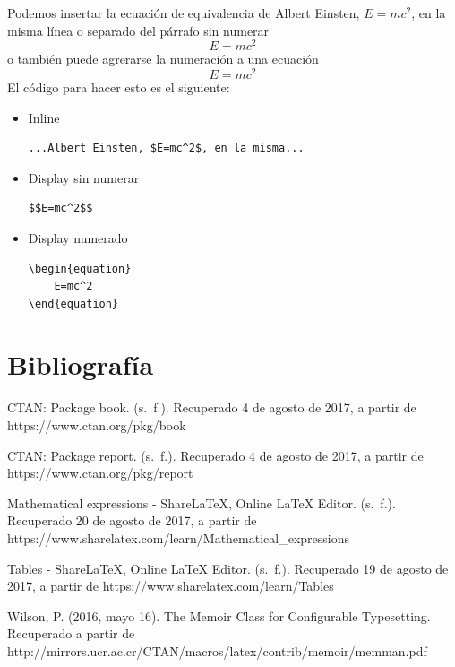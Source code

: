 \documentclass[10pt,journal,compsoc]{IEEEtran}
\begin{document}
Podemos insertar la ecuaci\'on de equivalencia de Albert Einsten, $E=mc^2$, en la misma l\'inea o separado del p\'arrafo sin numerar
$$E=mc^2$$
o tambi\'en puede agrerarse la numeraci\'on a una ecuaci\'on
\begin{equation}
	E=mc^2
\end{equation}
El c\'odigo para hacer esto es el siguiente:
\begin{itemize}
	\item Inline
\begin{lstlisting}
...Albert Einsten, $E=mc^2$, en la misma...
\end{lstlisting}
	\item Display sin numerar
\begin{lstlisting}
$$E=mc^2$$
\end{lstlisting}
	\item Display numerado
\begin{lstlisting}
\begin{equation}
	E=mc^2
\end{equation}
\end{lstlisting}
\end{itemize}

\section{Bibliograf\'ia}
CTAN: Package book. (s. f.). Recuperado 4 de agosto de 2017, a partir de https://www.ctan.org/pkg/book

CTAN: Package report. (s. f.). Recuperado 4 de agosto de 2017, a partir de https://www.ctan.org/pkg/report

Mathematical expressions - ShareLaTeX, Online LaTeX Editor. (s. f.). Recuperado 20 de agosto de 2017, a partir de https://www.sharelatex.com/learn/Mathematical_expressions

Tables - ShareLaTeX, Online LaTeX Editor. (s. f.). Recuperado 19 de agosto de 2017, a partir de https://www.sharelatex.com/learn/Tables

Wilson, P. (2016, mayo 16). The Memoir Class for Configurable Typesetting. Recuperado a partir de http://mirrors.ucr.ac.cr/CTAN/macros/latex/contrib/memoir/memman.pdf
\end{document}
